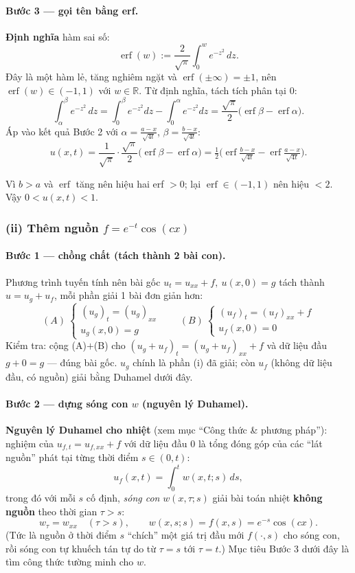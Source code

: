 \paragraph{Bước 3 --- gọi tên bằng erf.} \textbf{Định nghĩa} hàm sai số:
\[
  \operatorname{erf}(w):=\frac{2}{\sqrt\pi}\int_0^w e^{-z^2}\,dz.
\]
Đây là một hàm lẻ, tăng nghiêm ngặt và $\operatorname{erf}(\pm\infty)=\pm1$, nên $\operatorname{erf}(w)\in(-1,1)$ với $w\in\mathbb{R}$. Từ định nghĩa, tách tích phân tại $0$:
\[
  \int_\alpha^\beta e^{-z^2}\,dz=\int_0^\beta e^{-z^2}dz-\int_0^\alpha e^{-z^2}dz=\frac{\sqrt\pi}{2}\big(\operatorname{erf}\beta-\operatorname{erf}\alpha\big).
\]
Áp vào kết quả Bước 2 với $\alpha=\tfrac{a-x}{\sqrt{4t}}$, $\beta=\tfrac{b-x}{\sqrt{4t}}$:
\[
  u(x,t)=\frac{1}{\sqrt\pi}\cdot\frac{\sqrt\pi}{2}\big(\operatorname{erf}\beta-\operatorname{erf}\alpha\big)
  =\tfrac12\Big(\operatorname{erf}\tfrac{b-x}{\sqrt{4t}}-\operatorname{erf}\tfrac{a-x}{\sqrt{4t}}\Big).
\]
\begin{nhobox}
Vì $b>a$ và $\operatorname{erf}$ tăng nên hiệu hai erf $>0$; lại $\operatorname{erf}\in(-1,1)$ nên hiệu $<2$.
Vậy $0<u(x,t)<1$.
\end{nhobox}

\subsubsection*{(ii) Thêm nguồn $f=e^{-t}\cos(cx)$}

\paragraph{Bước 1 --- chồng chất (tách thành 2 bài con).} Phương trình tuyến tính nên bài gốc
$u_t=u_{xx}+f,\ u(x,0)=g$ tách thành $u=u_g+u_f$, mỗi phần giải 1 bài đơn giản hơn:
\[
  (A)\ \begin{cases}(u_g)_t=(u_g)_{xx}\\ u_g(x,0)=g\end{cases}
  \qquad
  (B)\ \begin{cases}(u_f)_t=(u_f)_{xx}+f\\ u_f(x,0)=0\end{cases}
\]
Kiểm tra: cộng (A)$+$(B) cho $(u_g+u_f)_t=(u_g+u_f)_{xx}+f$ và dữ liệu đầu $g+0=g$ --- đúng bài gốc.
$u_g$ chính là phần (i) đã giải; còn $u_f$ (không dữ liệu đầu, có nguồn) giải bằng Duhamel dưới đây.

\paragraph{Bước 2 --- dựng sóng con $w$ (nguyên lý Duhamel).} \textbf{Nguyên lý Duhamel cho nhiệt} (xem mục ``Công thức \& phương pháp''): nghiệm của $u_{f,t}=u_{f,xx}+f$ với dữ liệu đầu $0$ là tổng đóng góp của các ``lát nguồn'' phát tại từng thời điểm $s\in(0,t)$:
\[
  u_f(x,t)=\int_0^t w(x,t;s)\,ds,
\]
trong đó với mỗi $s$ cố định, \emph{sóng con} $w(x,\tau;s)$ giải bài toán nhiệt \textbf{không nguồn} theo thời gian $\tau>s$:
\[
  w_\tau=w_{xx}\quad(\tau>s),\qquad w(x,s;s)=f(x,s)=e^{-s}\cos(cx).
\]
(Tức là nguồn ở thời điểm $s$ ``chích'' một giá trị đầu mới $f(\cdot,s)$ cho sóng con, rồi sóng con tự khuếch tán tự do từ $\tau=s$ tới $\tau=t$.) Mục tiêu Bước 3 dưới đây là tìm công thức tường minh cho $w$.

